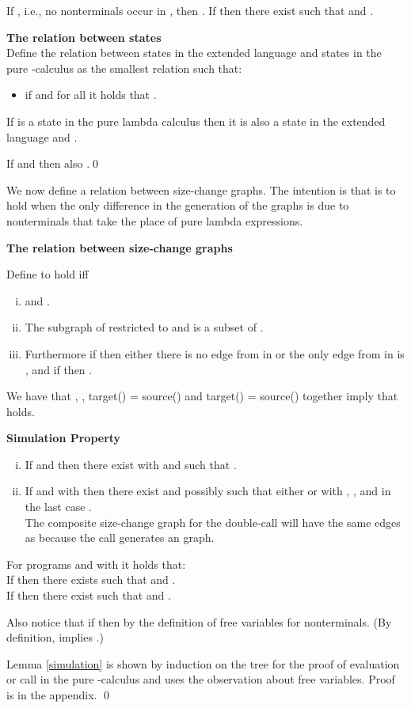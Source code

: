 \documentclass{LMCS}
\newcommand{\bi}{\begin{itemize}}
\newcommand{\ei}{\end{itemize}}
\newcommand{\be}{\begin{enumerate}}
\newcommand{\ee}{\end{enumerate}}
\newcommand{\bdfn}{\begin{defi}}
\newcommand{\edfn}{\end{defi}}
\newcommand{\blem}{\begin{lem}}
\newcommand{\elem}{\end{lem}}
\newcommand{\bcor}{\begin{cor}}
\newcommand{\ecor}{\end{cor}}
\newcommand{\bprf}{\proof}
\newcommand{\eprf}{\qed}
\theoremstyle{definition}\newtheorem{env}[thm]{Environment}
\begin{document}
If , i.e., no nonterminals occur in , then
.  If  then there exist 
such that  and .



\bdfn \textbf{The relation  between states}\\
Define the relation  between states in the extended language and states in the pure -calculus as the smallest relation  such that: 
\bi
\item[] if  and for all  it holds that .
\ei
\edfn

If  is a state in the pure lambda calculus then it is also a state in the extended language and .

\blem \label{push-S}
If  and  then also .\qed
\elem

We now define a relation  between size-change graphs. The intention is that  is to hold when the only difference in the generation of the graphs is due to nonterminals that take the place of pure lambda expressions.
\bdfn \textbf{The relation  between size-change graphs}

Define  to hold iff 
\be[i)]
\item  and .
\item The subgraph of  restricted to  and  is a subset of .
\item Furthermore if  then either there is no edge from  in  or the only edge from  in  is 
, and if  then . 
\ee
\edfn

\noindent We have that , , target() = source() and target() = source() together imply  that  holds.

\blem \label{simulation}\rm{\bf Simulation Property}
\be[i)]
\item If  and  then there exist  with  and  such that .
\item If  and  with  then there exist  and possibly  such that 
either  or  with , , and in the last case .\\ 
The composite size-change graph for the double-call  will have the same edges as  because the  call generates an  graph.
\ee
\elem

\bcor For programs  and  with  it holds that:\\ 
If  then there exists  such that  and .\\
If  then there exist  such that  and .
\ecor

Also notice that if  then  by the definition of free variables for nonterminals. (By definition,  implies .)

\bprf Lemma \ref{simulation} is shown by induction on the tree for the proof of evaluation or call in the pure -calculus and uses the observation about free variables. Proof is in the appendix.
\eprf
\end{document}
